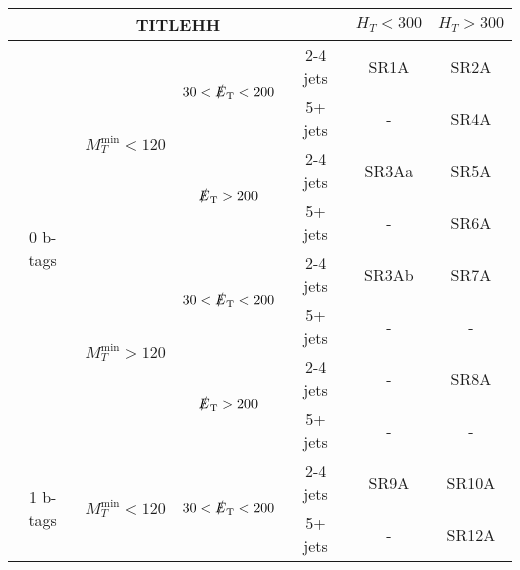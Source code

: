 \documentclass[plain,landscape]{article}
\newcommand{\met}{\slashed{E}_\mathrm{T}}
\begin{document}
\begin{table}
\renewcommand{\arraystretch}{1.3}
\centering
\begin{tabular}{|c|c|c|c|c|c|}
\hline
\multicolumn{4}{|c|}{  TITLEHH  }                      & $H_T < 300$ & $ H_T > 300$  \\ \hline
\multirow{8}{*}{0 b-tags}    & \multirow{4}{*}{$M_T^{\textrm{min}} < 120$} & \multirow{2}{*}{ ${\color{black} 30} < \met < 200$} & 2-4 jets    & SR1A                    & SR2A \\ \cline{4-6}
                             &                                             &                                              & 5+ jets     & -                       & SR4A  \\ \cline{3-6}
                             &                                             & \multirow{2}{*}{$\met > 200$}                & 2-4 jets    & SR3Aa                   & SR5A  \\ \cline{4-6}
                             &                                             &                                              & 5+ jets     & -                       & SR6A   \\ \cline{2-6}
                             & \multirow{4}{*}{$M_T^{\textrm{min}} > 120$} & \multirow{2}{*}{ ${\color{black} 30} < \met < 200$} & 2-4 jets    & SR3Ab                   & SR7A  \\ \cline{4-6}
                             &                                             &                                              & 5+ jets     & -                       & - \\ \cline{3-6}
                             &                                             & \multirow{2}{*}{$\met > 200$}                & 2-4 jets    & -                       & SR8A   \\ \cline{4-6}
                             &                                             &                                              & 5+ jets     & -                       & - \\ \cline{1-6}
\multirow{8}{*}{1 b-tags}    & \multirow{4}{*}{$M_T^{\textrm{min}} < 120$} & \multirow{2}{*}{ ${\color{black} 30} < \met < 200$} & 2-4 jets    & SR9A                    & SR10A  \\ \cline{4-6}
                             &                                             &                                              & 5+ jets     & -                       & SR12A  \\ \cline{3-6}

\end{tabular}
\end{table}
\end{document}
